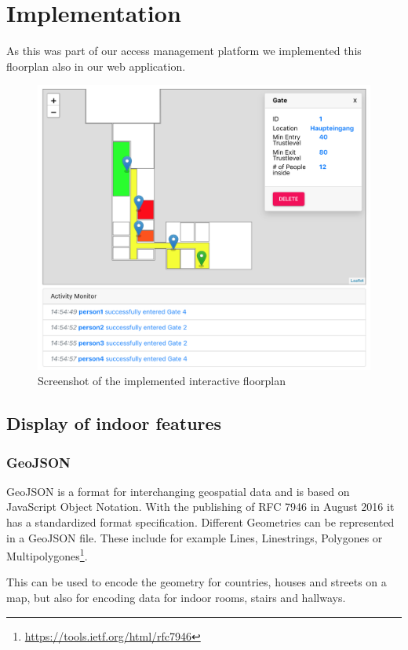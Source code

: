 \section{Implementation}
As this was part of our access management platform we implemented this floorplan also in our web application.

\begin{figure}[!hb]
	\centering
	\includegraphics[width=0.9\linewidth]{images/FloorplanScreenshot}
	\caption{Screenshot of the implemented interactive floorplan}
	\label{fig:FloorplanScreenshot}
\end{figure}

\subsection{Display of indoor features}
\label{Display of indoor features}

\subsubsection{GeoJSON}
\label{GeoJSON}

GeoJSON is a format for interchanging geospatial data and is based on JavaScript Object Notation. With the publishing of RFC 7946 in August 2016 it has a standardized format specification.
Different Geometries can be represented in a GeoJSON file. These include for example Lines, Linestrings, Polygones or Multipolygones\footnote{\url{https://tools.ietf.org/html/rfc7946}}. 

This can be used to encode the geometry for countries, houses and streets on a map, but also for encoding data for indoor rooms, stairs and hallways.


